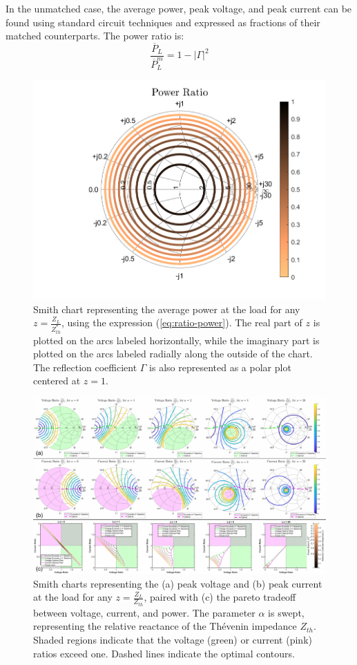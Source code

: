\documentclass{ifacconf}
\begin{document}
In the unmatched case, the average power, peak voltage, and peak current can be found using standard circuit techniques and expressed as fractions of their matched counterparts. The power ratio is:
\begin{equation}\label{eq:ratio-power}
     \frac{\overline{P}_L}{\overline{P}_L^m} = 1 - |\Gamma|^2
\end{equation}
\begin{figure}[bp!]
    \centering
    \includegraphics[width=\linewidth]{ifacconf_latex/figs/power-smith.png}
    \caption{Smith chart representing the average power at the load for any $z=\frac{Z_L}{Z_{th}^*}$, using the expression (\ref{eq:ratio-power}). The real part of $z$ is plotted on the arcs labeled horizontally, while the imaginary part is plotted on the arcs labeled radially along the outside of the chart. The reflection coefficient $\Gamma$ is also represented as a polar plot centered at $z=1$.}
    \label{fig:power-smith}
\end{figure}
\begin{figure}[tb!]
    \centering
    \includegraphics[width=18.2cm]{ifacconf_latex/figs/IFAC CAMS paretos (2).pdf}
    \caption{Smith charts representing the (a) peak voltage and (b) peak current at the load for any $z=\frac{Z_L}{Z_{th}}$, paired with (c) the pareto tradeoff between voltage, current, and power. The parameter $\alpha$ is swept, representing the relative reactance of the Thévenin impedance $Z_{th}$. Shaded regions indicate that the voltage (green) or current (pink) ratios exceed one. Dashed lines indicate the optimal contours.}
    \label{fig:ratio-smith}
\end{figure}
\end{document}
